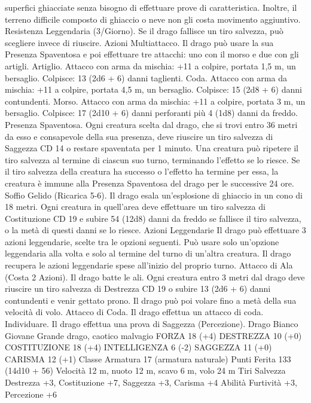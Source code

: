 \begin{multicols}{2}
superfici ghiacciate senza bisogno di effettuare prove di
caratteristica. Inoltre, il terreno difficile composto di ghiaccio o neve
non gli costa movimento aggiuntivo.
Resistenza Leggendaria (3/Giorno). Se il drago fallisce un tiro
salvezza, può scegliere invece di riuscire.
Azioni
Multiattacco. Il drago può usare la sua Presenza Spaventosa e
poi effettuare tre attacchi: uno con il morso e due con gli artigli.
Artiglio. Attacco con arma da mischia: +11 a colpire, portata 1,5
m, un bersaglio.
Colpisce: 13 (2d6 + 6) danni taglienti.
Coda. Attacco con arma da mischia: +11 a colpire, portata 4,5
m, un bersaglio.
Colpisce: 15 (2d8 + 6) danni contundenti.
Morso. Attacco con arma da mischia: +11 a colpire, portata 3 m,
un bersaglio.
Colpisce: 17 (2d10 + 6) danni perforanti più 4 (1d8) danni da freddo.
Presenza Spaventosa. Ogni creatura scelta dal drago, che si trovi
entro 36 metri da esso e consapevole della sua presenza, deve
riuscire un tiro salvezza di Saggezza CD 14 o restare spaventata per
1 minuto. Una creatura può ripetere il tiro salvezza al termine di
ciascun suo turno, terminando l’effetto se lo riesce. Se il tiro salvezza
della creatura ha successo o l’effetto ha termine per essa, la creatura è
immune alla Presenza Spaventosa del drago per le successive 24 ore.
Soffio Gelido (Ricarica 5-6). Il drago esala un’esplosione di
ghiaccio in un cono di 18 metri. Ogni creatura in quell’area deve
effettuare un tiro salvezza di Costituzione CD 19 e subire 54
(12d8) danni da freddo se fallisce il tiro salvezza, o la metà di
questi danni se lo riesce.
Azioni Leggendarie
Il drago può effettuare 3 azioni leggendarie, scelte tra le opzioni
seguenti. Può usare solo un’opzione leggendaria alla volta e solo
al termine del turno di un’altra creatura. Il drago recupera le
azioni leggendarie spese all’inizio del proprio turno.
Attacco di Ala (Costa 2 Azioni). Il drago batte le ali. Ogni creatura
entro 3 metri dal drago deve riuscire un tiro salvezza di Destrezza
CD 19 o subire 13 (2d6 + 6) danni contundenti e venir gettato prono.
Il drago può poi volare fino a metà della sua velocità di volo.
Attacco di Coda. Il drago effettua un attacco di coda.
Individuare. Il drago effettua una prova di Saggezza (Percezione).
Drago Bianco Giovane
Grande drago, caotico malvagio
FORZA 18 (+4)
DESTREZZA 10 (+0)
COSTITUZIONE 18 (+4)
INTELLIGENZA 6 (-2)
SAGGEZZA 11 (+0)
CARISMA 12 (+1)
Classe Armatura 17 (armatura naturale)
Punti Ferita 133 (14d10 + 56)
Velocità 12 m, nuoto 12 m, scavo 6 m, volo 24 m
Tiri Salvezza Destrezza +3, Costituzione +7, Saggezza +3,
Carisma +4
Abilità Furtività +3, Percezione +6

\end{multicols}
